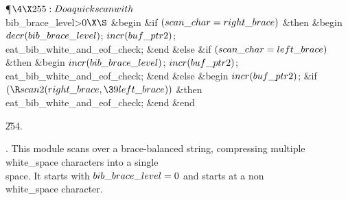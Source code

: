 \Y\P$\4\X255:Do a quick scan with $\\{bib\_brace\_level}>0$\X\S$\6
\&{begin} \6
\&{if} $(\\{scan\_char}=\\{right\_brace})$ \1\&{then}\6
\&{begin} $\\{decr}(\\{bib\_brace\_level})$;\5
$\\{incr}(\\{buf\_ptr2})$;\6
\\{eat\_bib\_white\_and\_eof\_check};\6
\&{end}\6
\4\&{else} \&{if} $(\\{scan\_char}=\\{left\_brace})$ \1\&{then}\6
\&{begin} $\\{incr}(\\{bib\_brace\_level})$;\5
$\\{incr}(\\{buf\_ptr2})$;\6
\\{eat\_bib\_white\_and\_eof\_check};\6
\&{end}\6
\4\&{else} \&{begin} $\\{incr}(\\{buf\_ptr2})$;\6
\&{if} $(\R\\{scan2}(\\{right\_brace},\39\\{left\_brace}))$ \1\&{then}\5
\\{eat\_bib\_white\_and\_eof\_check};\2\6
\&{end}\2\2\6
\&{end}\par
\U254.\fi

.
This module scans over a brace-balanced string, compressing multiple
\\{white\_space} characters into a single \\{space}.  It starts with
$\\{bib\_brace\_level}=0$ and starts at a non\\{white\_space} character.

